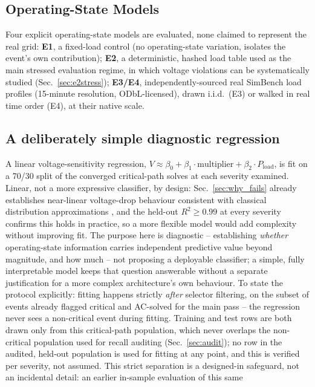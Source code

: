 \documentclass[11pt,conference]{IEEEtran}
\begin{document}
\subsection{Operating-State Models}
\label{sec:opstates}
Four explicit operating-state models are evaluated, none claimed to represent the real grid:
\textbf{E1}, a fixed-load control (no operating-state variation, isolates the event's own
contribution); \textbf{E2}, a deterministic, hashed load table used as the main stressed evaluation
regime, in which voltage violations can be systematically studied (Sec.~\ref{sec:e2stress});
\textbf{E3/E4}, independently-sourced real SimBench load profiles \cite{ref:simbench2020} (15-minute
resolution, ODbL-licensed), drawn i.i.d.\ (E3) or walked in real time order (E4), at their native
scale.

\subsection{A deliberately simple diagnostic regression}
\label{sec:regression}
A linear voltage-sensitivity regression, $V \approx \beta_0 + \beta_1\cdot\text{multiplier} +
\beta_2\cdot P_{\mathrm{load}}$, is fit on a 70/30 split of the converged critical-path solves at
each severity examined. Linear, not a more expressive classifier, by design: Sec.~\ref{sec:why_fails}
already establishes near-linear voltage-drop behaviour consistent with classical distribution
approximations \cite{ref:baran_wu1989}, and the held-out $R^2 \geq 0.99$ at every severity confirms
this holds in practice, so a more flexible model would add complexity without improving fit. The
purpose here is diagnostic -- establishing \textit{whether} operating-state information carries
independent predictive value beyond magnitude, and how much -- not proposing a deployable
classifier; a simple, fully interpretable model keeps that question answerable without a separate
justification for a more complex architecture's own behaviour. To state the protocol explicitly: fitting happens strictly \textit{after}
selector filtering, on the subset of events already flagged critical and AC-solved for the main pass
-- the regression never sees a non-critical event during fitting. Training and test rows are both
drawn only from this critical-path population, which never overlaps the non-critical population used
for recall auditing (Sec.~\ref{sec:audit}); no row in the audited, held-out population is used for
fitting at any point, and this is verified per severity, not assumed. This strict separation is a
designed-in safeguard, not an incidental detail: an earlier in-sample evaluation of this same
\end{document}

